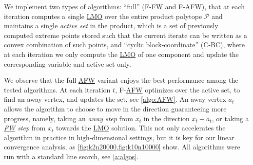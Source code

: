 \documentclass{article}
\newcommand{\mP}{\mathcal{P}}
\newif\ifTODO
\newcommand{\dav}[1]{\ifTODO \todo[size=\scriptsize, color=yellow]{DM: #1}{} \fi}
\newcommand\newlink[2]{\hyperlink{#1}{\normalcolor #2}}
\newcommand{\FW}{\newlink{def:acronym_frank_wolfe}{FW}}
\newcommand{\AFW}{\newlink{def:acronym_away_frank_wolfe}{AFW}}
\newcommand{\LMO}{\newlink{def:acronym_linear_minimization_oracle}{LMO}}
\begin{document}
We implement two types of algorithms: ``full'' (F-\FW{} and F-\AFW{}), that at each iteration computes a single \LMO{} over the entire product polytope $\mP$ and maintains a single \emph{active set} in the product, which is a set of previously computed extreme points stored such that the current iterate can be written as a convex combination of such points,
and ``cyclic block-coordinate'' (C-BC), where at each iteration we only compute the \LMO{} of one component and update the corresponding variable and active set only.


We observe that the full \AFW{} variant enjoys the best performance among the tested algorithms.
At each iteration $t$, F-\AFW{} optimizes over the active set, to find an away vertex, and updates the set, see \cref{algo:AFW}.
An away vertex $a_t$ allows the algorithm to choose to move in the direction guaranteeing more progress, namely, taking an \emph{away step} from $x_t$ in the direction $x_t - a_t$, or taking a \emph{\FW{} step} from $x_t$ towards the \LMO{} solution.
This not only accelerates the algorithm in practice in high-dimensional settings, but it is key for our linear convergence analysis, as \cref{fig:k2n20000,fig:k10n10000} show.
All algorithms were run with a standard line search, see \cref{a:algos}.
\end{document}
